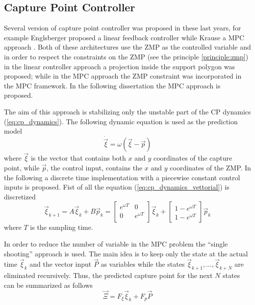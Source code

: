 \subsection{Capture Point Controller}
Several version of capture point controller was proposed in these last years,
for example Englsberger proposed a linear feedback controller \cite{Englsberger2011}
while Krause a MPC approach \cite{Krause2012}.
Both of these architectures use the ZMP as the controlled variable and in order to respect the
constraints on the ZMP (see the principle \ref{principle:zmp}) in the linear controller approach
a projection inside the support polygon was proposed; while in the MPC approach the ZMP constraint
was incorporated in the MPC framework.
In the following dissertation the MPC approach is proposed.
\par
The aim of this approach is stabilizing only the unstable part of the CP dynamics
(\ref{eq:cp_dynamics}). The following dynamic equation is used as the prediction model
\begin{equation}
  \label{eq:cp_dynamics_vettorial}
  \dot{\vec{\xi}} = \omega(\vec{\xi} - \vec{p})
\end{equation}
where $\vec{\xi}$ is the vector that contains both $x$ and $y$ coordinates of the capture point,
while $\vec{p}$, the control input, contains the  $x$ and $y$ coordinates of the ZMP.
In the following a discrete time implementation with a piecewise constant control inputs is
proposed. Fist of all the equation (\ref{eq:cp_dynamics_vettorial}) is discretized
\[
\vec{\xi}_{k+1} = A \vec{\xi}_{k} + B \vec{p}_{k} =
\begin{bmatrix}
  e^{\omega T} & 0 \\
  0 & e^{\omega T} \\
\end{bmatrix}
\vec{\xi}_{k} +
\begin{bmatrix}
  1-e^{\omega T} \\
  1-e^{\omega T}
\end{bmatrix}
\vec{p}_{k} 
\]
where $T$ is the sampling time.
\par
In order to reduce the number of variable in the MPC problem the
``single shooting'' approach is used. The main idea is to keep only the state at the actual time
$\vec{\xi}_k$ and the vector input $\vec{P}$ as variables
while the states $\vec{\xi}_{k + 1}, \dots, \vec{\xi}_{k + N}$ are eliminated recursively.
Thus, the predicted capture point for the next $N$ states can be summarized as follows
\[
\vec{\Xi} = F_{\xi} \vec{\xi}_k + F_{p} \vec{P}
\]
